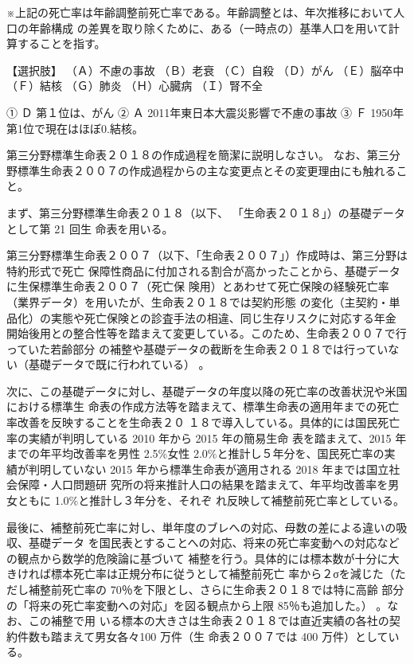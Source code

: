 \documentclass[report,gutter=10mm,fore-edge=10mm,uplatex,dvipdfmx]{jlreq}
\begin{document}
※上記の死亡率は年齢調整前死亡率である。年齢調整とは、年次推移において人口の年齢構成
の差異を取り除くために、ある（一時点の）基準人口を用いて計算することを指す。

【選択肢】
（Ａ）不慮の事故 （Ｂ）老衰 （Ｃ）自殺
（Ｄ）がん （Ｅ）脳卒中 （Ｆ）結核
（Ｇ）肺炎 （Ｈ）心臓病 （Ｉ）腎不全

① Ｄ 
第１位は、がん
② Ａ 
2011年東日本大震災影響で不慮の事故
③ Ｆ
1950年第1位で現在はほぼ0.結核。


第三分野標準生命表２０１８の作成過程を簡潔に説明しなさい。
なお、第三分野標準生命表２００７の作成過程からの主な変更点とその変更理由にも触れること。

まず、第三分野標準生命表２０１８（以下、
「生命表２０１８」）の基礎データとして第 21 回生
命表を用いる。

第三分野標準生命表２００７（以下、「生命表２００７」）作成時は、第三分野は特約形式で死亡
保障性商品に付加される割合が高かったことから、基礎データに生保標準生命表２００７（死亡保
険用）とあわせて死亡保険の経験死亡率（業界データ）を用いたが、生命表２０１８では契約形態
の変化（主契約・単品化）の実態や死亡保険との診査手法の相違、同じ生存リスクに対応する年金
開始後用との整合性等を踏まえて変更している。このため、生命表２００７で行っていた若齢部分
の補整や基礎データの截断を生命表２０１８では行っていない（基礎データで既に行われている）
。

次に、この基礎データに対し、基礎データの年度以降の死亡率の改善状況や米国における標準生
命表の作成方法等を踏まえて、標準生命表の適用年までの死亡率改善を反映することを生命表２０
１８で導入している。具体的には国民死亡率の実績が判明している 2010 年から 2015 年の簡易生命
表を踏まえて、2015 年までの年平均改善率を男性 2.5\%女性 2.0\%と推計し５年分を、国民死亡率の実
績が判明していない 2015 年から標準生命表が適用される 2018 年までは国立社会保障・人口問題研
究所の将来推計人口の結果を踏まえて、年平均改善率を男女ともに 1.0\%と推計し３年分を、それぞ
れ反映して補整前死亡率としている。

最後に、補整前死亡率に対し、単年度のブレへの対応、母数の差による違いの吸収、基礎データ
を国民表とすることへの対応、将来の死亡率変動への対応などの観点から数学的危険論に基づいて
補整を行う。具体的には標本数が十分に大きければ標本死亡率は正規分布に従うとして補整前死亡
率から２σを減じた（ただし補整前死亡率の 70％を下限とし、さらに生命表２０１８では特に高齢
部分の「将来の死亡率変動への対応」を図る観点から上限 85％も追加した。）
。なお、この補整で用
いる標本の大きさは生命表２０１８では直近実績の各社の契約件数も踏まえて男女各々100 万件（生
命表２００７では 400 万件）としている。
\end{document}
